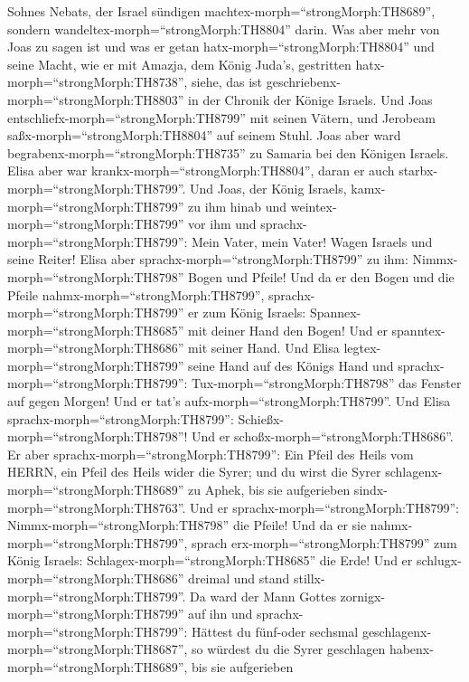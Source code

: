 Sohnes Nebats, der Israel sündigen machtex-morph=``strongMorph:TH8689'',
sondern wandeltex-morph=``strongMorph:TH8804'' darin.  Was
aber mehr von Joas zu sagen ist und was er getan
hatx-morph=``strongMorph:TH8804'' und seine Macht, wie er mit Amazja,
dem König Juda's, gestritten hatx-morph=``strongMorph:TH8738'', siehe,
das ist geschriebenx-morph=``strongMorph:TH8803'' in der Chronik der
Könige Israels.  Und Joas
entschliefx-morph=``strongMorph:TH8799'' mit seinen Vätern, und Jerobeam
saßx-morph=``strongMorph:TH8804'' auf seinem Stuhl. Joas aber ward
begrabenx-morph=``strongMorph:TH8735'' zu Samaria bei den Königen
Israels.  Elisa aber war
krankx-morph=``strongMorph:TH8804'', daran er auch
starbx-morph=``strongMorph:TH8799''. Und Joas, der König Israels,
kamx-morph=``strongMorph:TH8799'' zu ihm hinab und
weintex-morph=``strongMorph:TH8799'' vor ihm und
sprachx-morph=``strongMorph:TH8799'': Mein Vater, mein Vater! Wagen
Israels und seine Reiter!  Elisa aber
sprachx-morph=``strongMorph:TH8799'' zu ihm:
Nimmx-morph=``strongMorph:TH8798'' Bogen und Pfeile! Und da er den Bogen
und die Pfeile nahmx-morph=``strongMorph:TH8799'', 
sprachx-morph=``strongMorph:TH8799'' er zum König Israels:
Spannex-morph=``strongMorph:TH8685'' mit deiner Hand den Bogen! Und er
spanntex-morph=``strongMorph:TH8686'' mit seiner Hand. Und Elisa
legtex-morph=``strongMorph:TH8799'' seine Hand auf des Königs Hand
 und sprachx-morph=``strongMorph:TH8799'':
Tux-morph=``strongMorph:TH8798'' das Fenster auf gegen Morgen! Und er
tat's aufx-morph=``strongMorph:TH8799''. Und Elisa
sprachx-morph=``strongMorph:TH8799'':
Schießx-morph=``strongMorph:TH8798''! Und er
schoßx-morph=``strongMorph:TH8686''. Er aber
sprachx-morph=``strongMorph:TH8799'': Ein Pfeil des Heils vom HERRN, ein
Pfeil des Heils wider die Syrer; und du wirst die Syrer
schlagenx-morph=``strongMorph:TH8689'' zu Aphek, bis sie aufgerieben
sindx-morph=``strongMorph:TH8763''.  Und er
sprachx-morph=``strongMorph:TH8799'': Nimmx-morph=``strongMorph:TH8798''
die Pfeile! Und da er sie nahmx-morph=``strongMorph:TH8799'', sprach
erx-morph=``strongMorph:TH8799'' zum König Israels:
Schlagex-morph=``strongMorph:TH8685'' die Erde! Und er
schlugx-morph=``strongMorph:TH8686'' dreimal und stand
stillx-morph=``strongMorph:TH8799''.  Da ward der Mann
Gottes zornigx-morph=``strongMorph:TH8799'' auf ihn und
sprachx-morph=``strongMorph:TH8799'': Hättest du fünf-oder sechsmal
geschlagenx-morph=``strongMorph:TH8687'', so würdest du die Syrer
geschlagen habenx-morph=``strongMorph:TH8689'', bis sie aufgerieben
